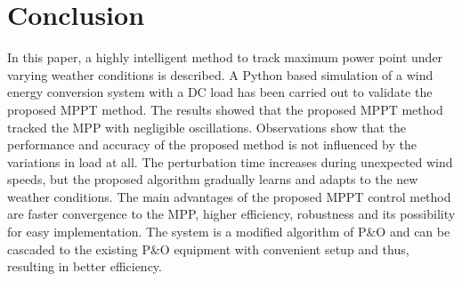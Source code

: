 \section{Conclusion}
 In this paper, a highly intelligent method to track maximum power point under varying weather conditions is described. A Python based simulation of a wind energy conversion system with a DC load has been carried out to validate the proposed MPPT method. The results showed that the proposed MPPT method tracked the MPP with negligible oscillations. Observations show that the performance and accuracy of the proposed method is not influenced by the variations in load at all. The perturbation time increases during unexpected wind speeds, but the proposed algorithm gradually learns and adapts to the new weather conditions. The main advantages of the proposed MPPT control method are faster convergence to the MPP, higher efficiency, robustness and its possibility for easy implementation. The system is a modified algorithm of P\&O and can be cascaded to the existing P\&O equipment with convenient setup and thus, resulting in better efficiency.

